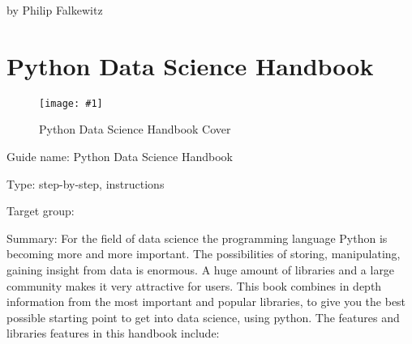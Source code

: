 \documentclass{article}
\newlength{\imgwidth}
\newcommand\scaledgraphics[2]{%
                
\settowidth{\imgwidth}{\texttt{[image: \#1]}}%
                
\setlength{\imgwidth}{\minof{\imgwidth}{#2\textwidth}}%
                
\texttt{[image: \#1]}%
                
}
\begin{document}
by Philip Falkewitz





\section{Python Data Science Handbook}\label{H8115129}



\begin{center}
\begin{figure}
\scaledgraphics{43052757-2454-42ab-a98c-c7977cb4e249.png}{0.5}
\caption*{Python Data Science Handbook Cover}\label{F16921711}
\end{figure}


\end{center}


Guide name: Python Data Science Handbook \autocite{vanderplas_python_2016}


Type: step-by-step, instructions


Target group:


Summary: For the field of data science the programming language Python is becoming more and more important. The possibilities of storing, manipulating, gaining insight from data is enormous. A huge amount of libraries and a large community makes it very attractive for users. This book combines in depth information from the most important and popular libraries, to give you the best possible starting point to get into data science, using python. The features and libraries features in this handbook include: 
\end{document}
